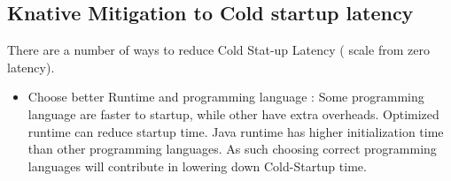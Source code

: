 \documentclass{article}
\begin{document}
\pagebreak
\subsection{ Knative Mitigation to Cold startup latency}
\begin{flushleft}
There are a number of ways to reduce Cold Stat-up Latency ( scale from zero latency).
\newline
\begin{itemize}
    \item Choose better Runtime and programming language : Some programming language are faster to startup, while other have extra overheads. Optimized runtime can reduce startup time. Java runtime has higher initialization time than other programming languages. As such choosing correct programming languages will contribute in lowering down Cold-Startup time.


\end{itemize}
\end{flushleft}
\end{document}

